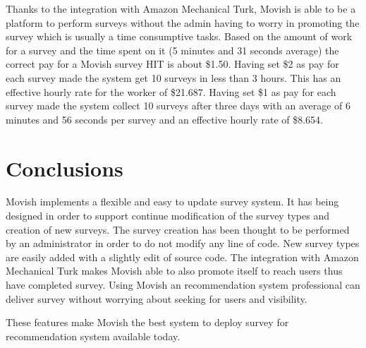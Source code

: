Thanks to the integration with Amazon Mechanical Turk, Movish is able to be a platform to perform surveys without the admin having to worry in promoting the survey which is usually a time consumptive tasks. Based on the amount of work for a survey and the time spent on it (5 minutes and 31 seconds average) the correct pay for a Movish survey HIT is about \$1.50. Having set \$2 as pay for each survey made the system get 10 surveys in less than 3 hours. This has an effective hourly rate for the worker of \$21.687. Having set \$1 as pay for each survey made the system collect 10 surveys after three days with an average of 6 minutes and 56 seconds per survey and an effective hourly rate of \$8.654.

\section{Conclusions}
\label{sec:survey_management_conclusions}

Movish implements a flexible and easy to update survey system. It has being designed in order to support continue modification of the survey types and creation of new surveys. The survey creation has been thought to be performed by an administrator in order to do not modify any line of code. New survey types are easily added with a slightly edit of source code. 
The integration with Amazon Mechanical Turk makes Movish able to also promote itself to reach users thus have completed survey. Using Movish an recommendation system professional can deliver survey without worrying about seeking for users and visibility. 

These features make Movish the best system to deploy survey for recommendation system available today.

\acresetall